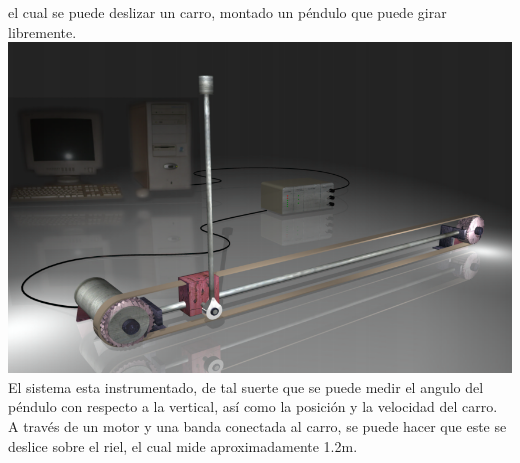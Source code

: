 \documentclass[12pt,a4paper]{book}
\begin{document}
el cual se puede deslizar un carro, montado un péndulo que
puede girar libremente. 
\\
\includegraphics[scale=.4]{./1_pendulo.png}
\\
El sistema esta instrumentado, de tal suerte que
se puede medir el angulo del péndulo con respecto a la vertical, así como
la posición y la velocidad del carro. A través de un motor y una banda
conectada al carro, se puede hacer que este se deslice sobre el riel, el cual
mide aproximadamente 1.2m. \\

\newpage
\end{document}
